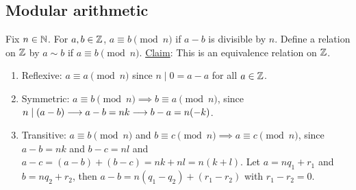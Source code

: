 \documentclass[]{article}
\begin{document}
\subsection*{Modular arithmetic}
Fix $n\in\mathbb{N}$. For $a,b\in\mathbb{Z}$, $a \equiv b\pmod{n}$ if $a-b$ is divisible by $n$.
Define a relation on $\mathbb{Z}$ by $a\sim b$ if $a\equiv b\pmod{n}$.
\ul{Claim}: This is an equivalence relation on $\mathbb{Z}$.
\begin{enumerate}
	\item Reflexive: $a\equiv a \pmod{n}$ since $n\mid 0 = a-a$ for all $a\in\mathbb{Z}$.
	\item Symmetric: $a\equiv b\pmod{n}\implies b\equiv a\pmod{n}$, since $n\mid(a-b) \longrightarrow a-b=nk \longrightarrow b-a = n(-k)$.
	\item Transitive: $a\equiv b\pmod{n}$ and $b\equiv c\pmod{n} \implies a\equiv c\pmod{n}$, since $a-b=nk$ and $b-c=nl$ and $a-c = (a-b)+(b-c) = nk+nl = n(k+l)$.
	Let $a = nq_1+r_1$ and $b=nq_2+r_2$, then $a-b = n(q_1-q_2) + (r_1-r_2)$ with $r_1-r_2 = 0$.
\end{enumerate}
\end{document}
